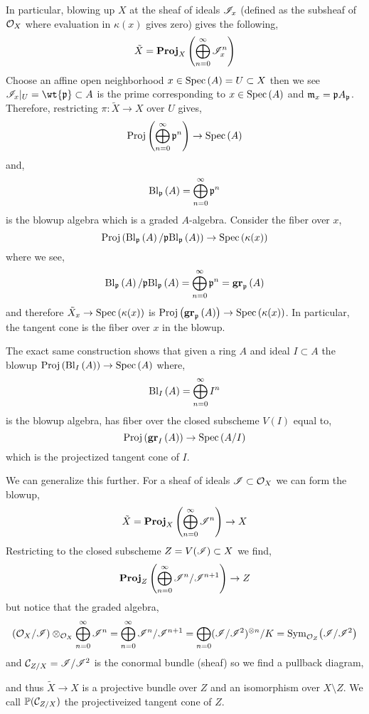 \documentclass[12pt]{article}
\begin{document}
\begin{rmk}
In particular, blowing up $X$ at the sheaf of ideals $\mathscr{I}_x$ (defined as the subsheaf of $\mathcal{O}_{X}$ where evaluation in $\kappa(x)$ gives zero) gives the following,
\[ \tilde{X} =  \mathbf{Proj}_{X}\left( \bigoplus_{n = 0}^\infty \mathscr{I}_x^n \right) \]
Choose an affine open neighborhood $x \in \mathrm{Spec}\left( A \right) = U \subset X$ then we see $\I_x |_U = \wt{\p} \subset A$ is the prime corresponding to $x \in \mathrm{Spec}\left( A \right)$ and $\mathfrak{m}_x = \mathfrak{p} A_{\mathfrak{p}}$. Therefore, restricting $\pi : \tilde{X} \to X$ over $U$ gives,
\[ \mathrm{Proj}\left( \bigoplus_{n = 0}^\infty \mathfrak{p}^n \right) \to \mathrm{Spec}\left( A \right) \]
and,
\[ \mathrm{Bl}_{\mathfrak{p}} \left( A \right) = \bigoplus_{n = 0}^\infty \mathfrak{p}^n \]
is the blowup algebra which is a graded $A$-algebra. Consider the fiber over $x$,
\[ \mathrm{Proj}\left( \mathrm{Bl}_{\mathfrak{p}} \left( A \right) / \mathfrak{p} \mathrm{Bl}_{\mathfrak{p}} \left( A \right) \right) \to \mathrm{Spec}\left( \kappa(x) \right) \]
where we see,
\[ \mathrm{Bl}_{\mathfrak{p}} \left( A \right) / \mathfrak{p} \mathrm{Bl}_{\mathfrak{p}} \left( A \right) = \bigoplus_{n = 0}^\infty \mathfrak{p}^n = \mathbf{gr}_{\mathfrak{p}}\left(A\right) \]
and therefore $\tilde{X}_x \to \mathrm{Spec}\left( \kappa(x) \right)$ is $\mathrm{Proj}\left( \mathbf{gr}_{\mathfrak{p}}\left(A\right) \right) \to \mathrm{Spec}\left( \kappa(x) \right)$.
In particular, the tangent cone is the fiber over $x$ in the blowup. 
\end{rmk}

\begin{rmk}
The exact same construction shows that given a ring $A$ and ideal $I \subset A$ the blowup $\mathrm{Proj}\left( \mathrm{Bl}_{I} \left( A \right) \right) \to \mathrm{Spec}\left( A \right)$ where,
\[ \mathrm{Bl}_{I} \left( A \right) = \bigoplus_{n = 0}^\infty I^n \]
is the blowup algebra, has fiber over the closed subscheme $V(I)$ equal to,
\[ \mathrm{Proj}\left( \mathbf{gr}_{I}\left(A\right) \right) \to \mathrm{Spec}\left( A/I \right) \]
which is the projectized tangent cone of $I$. 
\end{rmk}

\begin{rmk}
We can generalize this further. For a sheaf of ideals $\mathscr{I} \subset \mathcal{O}_{X}$ we can form the blowup,
\[ \tilde{X} = \mathbf{Proj}_{X}\left( \bigoplus_{n = 0}^\infty \mathscr{I}^n \right) \to X \]
Restricting to the closed subscheme $Z = V(\mathscr{I}) \subset X$ we find,
\[ \mathbf{Proj}_{Z}\left( \bigoplus_{n = 0}^\infty \mathscr{I}^n / \mathscr{I}^{n+1} \right) \to Z \]
but notice that the graded algebra,
\[ (\mathcal{O}_{X} / \mathscr{I}) \otimes_{\mathcal{O}_{X}} \bigoplus_{n = 0}^\infty \mathscr{I}^n =  \bigoplus_{n = 0}^\infty \mathscr{I}^n / \mathscr{I}^{n+1} = \bigoplus_{n = 0} (\mathscr{I} / \mathscr{I}^2)^{\otimes n} / K = \mathrm{Sym}_{\mathcal{O}_{Z}}\! \left( \mathscr{I} / \mathscr{I}^2 \right) \]
and $\mathcal{C}_{Z/X} = \mathscr{I} / \mathscr{I}^2$ is the conormal bundle (sheaf) so we find a pullback diagram,
\begin{center}
\end{center}
and thus $\tilde{X} \to X$ is a projective bundle over $Z$ and an isomorphism over $X \setminus Z$. We call $\mathbb{P}(\mathcal{C}_{Z/X})$ the projectiveized tangent cone of $Z$.
\end{rmk}
\end{document}
